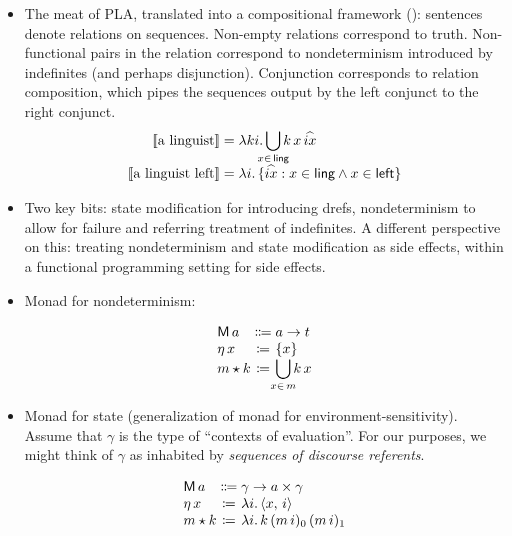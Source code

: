 \begin{itemize}
	\item The meat of PLA, translated into a compositional framework (\citealt{Dekker:1994}): sentences denote relations on sequences. Non-empty relations correspond to truth. Non-functional pairs in the relation correspond to nondeterminism introduced by indefinites (and perhaps disjunction). Conjunction corresponds to relation composition, which pipes the sequences output by the left conjunct to the right conjunct.%
	\[\begin{array}{r@{}l}
		\sv{\text{a linguist}} &{}= \lambda ki.\displaystyle\bigcup_{\mathclap{x\in\,\textsf{ling}}}k\,x\,\widehat{ix}%
		\\
		\sv{\text{a linguist left}} &{}= \lambda i.\,\{\widehat{ix} : x \in \textsf{ling} \wedge x \in \textsf{left}\}%
	\end{array}\]%

	\item Two key bits: state modification for introducing drefs, nondeterminism to allow for failure and referring treatment of indefinites. A different perspective on this: treating nondeterminism and state modification as side effects, within a functional programming setting for side effects. %
	
	\item Monad for nondeterminism:
	\begin{defi}\label{set}
		\[\begin{array}[t]
			{@{}l@{}c@{}l@{}}
			\textsf{M}\,a &{}\Coloneqq{} &a \ra t%
			\\
			\eta\,x &{}\ceq{} &\{x\}
			\\
			m \star k &{}\ceq{} &\displaystyle\bigcup_{\mathclap{x\in \,m}}k\,x%
		\end{array}\]
	\end{defi}
	
	\item Monad for state (generalization of monad for environment-sensitivity). Assume that $\gamma$ is the type of ``contexts of evaluation''. For our purposes, we might think of $\gamma$ as inhabited by \emph{sequences of discourse referents}.%
	\begin{defi}\label{state}
		\[\begin{array}[t]
			{@{}l@{}c@{}l@{}}
			\textsf{M}\,a &{}\Coloneqq{} &\gamma \ra a \times \gamma	%
			\\
			\eta\,x &{}\ceq{} &\lambda i.\,\ab{x,\,i}
			\\
			m \star k &{}\ceq{} &\lambda i.\,k\,(m\,i)_0\,(m\,i)_1%
		\end{array}\]
	\end{defi}
	

\end{itemize}
